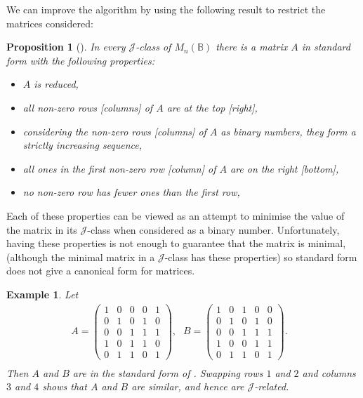 \documentclass[11pt]{article}
\newtheorem{prop}[thm]{Proposition}
\newtheorem{ex}[thm]{Example}
\numberwithin{equation}{section}
\newcommand{\B}{\mathbb{B}}
\newcommand{\Bn}{M_n(\B)}
\newcommand{\J}{\mathscr{J}}
\begin{document}
We can improve the algorithm by using the following result to restrict the
matrices considered:

\begin{prop}[\cite{Breen1997aa}]
  In every $\J$-class of $\Bn$ there is a matrix $A$ in \emph{standard form} with the following properties:
  \begin{itemize}
  \item{$A$ is reduced,}
  \item{all non-zero rows [columns] of $A$ are at the top [right],}
  \item{considering the non-zero rows [columns] of $A$ as binary numbers, they
        form a strictly increasing sequence,}
  \item{all ones in the first non-zero row [column] of $A$ are on the right
        [bottom],}
  \item{no non-zero row has fewer ones than the first row,}
  \end{itemize}
\end{prop}

Each of these properties can be viewed as an attempt to minimise the value of
the matrix in its $\J$-class when considered as a binary number. Unfortunately,
having these properties is not enough to guarantee that the matrix is minimal,
(although the minimal matrix in a $\J$-class has these properties) so standard
form does not give a canonical form for matrices.

\begin{ex}
Let
\begin{align*}
  A = \begin{pmatrix}
    1 & 0 & 0 & 0 & 1 \\
    0 & 1 & 0 & 1 & 0 \\
    0 & 0 & 1 & 1 & 1 \\
    1 & 0 & 1 & 1 & 0 \\
    0 & 1 & 1 & 0 & 1 
  \end{pmatrix}\text{,}&
  B = \begin{pmatrix}
    1 & 0 & 1 & 0 & 0 \\
    0 & 1 & 0 & 1 & 0 \\
    0 & 0 & 1 & 1 & 1 \\
    1 & 0 & 0 & 1 & 1 \\
    0 & 1 & 1 & 0 & 1 
  \end{pmatrix}.&\\
\end{align*}
Then $A$ and $B$ are in the standard form of
. Swapping rows $1$ and $2$ and columns $3$
and $4$ shows that $A$ and $B$ are similar, and hence are $\J$-related.
\end{ex}
\end{document}
